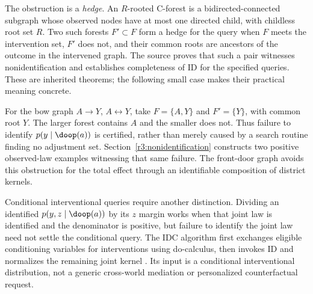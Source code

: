 The obstruction is a \emph{hedge}. An $R$-rooted C-forest is a
bidirected-connected subgraph whose observed nodes have at most one
directed child, with childless root set $R$. Two such forests
$F'\subset F$ form a hedge for the query when $F$ meets the intervention
set, $F'$ does not, and their common roots are ancestors of the outcome
in the intervened graph. The source proves that such a pair witnesses
nonidentification and establishes completeness of ID for the specified
queries. These are inherited theorems; the following small case makes
their practical meaning concrete.

For the bow graph $A\to Y$, $A\leftrightarrow Y$, take
$F=\{A,Y\}$ and $F'=\{Y\}$, with common root $Y$. The larger
forest contains $A$ and the smaller does not. Thus failure to identify
$p(y\mid\doop(a))$ is certified, rather than merely caused by a
search routine finding no adjustment set. Section~\ref{r3:nonidentification}
constructs two positive observed-law examples witnessing that same
failure. The front-door graph avoids this obstruction for the total
effect through an identifiable composition of district kernels.

Conditional interventional queries require another distinction. Dividing
an identified $p(y,z\mid\doop(a))$ by its $z$ margin works when that
joint law is identified and the denominator is positive, but failure
to identify the joint law need not settle the conditional query.
The IDC algorithm first exchanges eligible conditioning variables for
interventions using do-calculus, then invokes ID and normalizes the
remaining joint kernel \citep[Section 5, Figure 3]{id2006}.
Its input is a conditional interventional distribution, not a generic
cross-world mediation or personalized counterfactual request.


